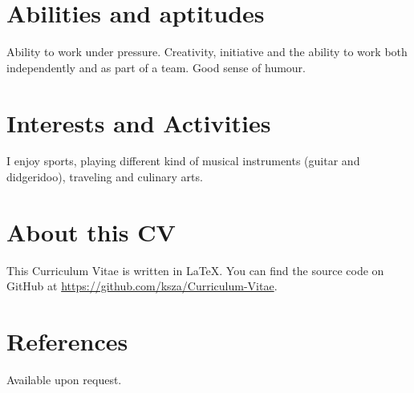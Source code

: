 \documentclass[a4paper,10pt]{article}
\begin{document}
\section{Abilities and aptitudes}
Ability to work under pressure.
Creativity, initiative and the ability to work both independently and as part of
a team. Good sense of humour.

\section{Interests and Activities}
I enjoy sports, playing different kind of musical instruments (guitar and
didgeridoo), traveling and culinary arts.

\section{About this CV}
This Curriculum Vitae is written in \LaTeX. You can find the source code on GitHub at \url{https://github.com/ksza/Curriculum-Vitae}.

\section{References}
Available upon request.


\end{document}
